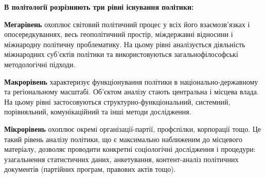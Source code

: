\noindent\textbf{В політології розрізняють три рівні існування політики:}

\textbf{Мегарівень} охоплює світовий політичний процес у всіх його взаємозв’язках і опосередкуваннях, весь геополітичний простір, міждержавні відносини і міжнародну політичну проблематику. На цьому рівні аналізується діяльність міжнародних суб’єктів політики та використовуються загальнофілософські методологічні підходи.

\textbf{Макрорівень} характеризує функціонування політики в національно-державному та регіональному масштабі. Об’єктом аналізу стають центральна і місцева влада. На цьому рівні застосовуються структурно-функціональний, системний, порівняльний, комунікаційний та інші методи дослідження.

\textbf{Мікрорівень} охоплює окремі організації-партії, профспілки, корпорації тощо. Це такий рівень аналізу політики, що є максимально наближеним до місцевого матеріалу, дозволяє проводити конкретні соціологічні дослідження і процедури: узагальнення статистичних даних, анкетування, контент-аналіз політичних документів (партійних програм, правових актів тощо).

